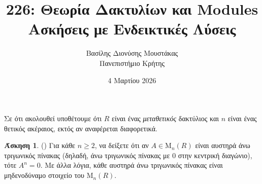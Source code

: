 \documentclass[12pt,a4paper,reqno]{amsart}
\title{226: Θεωρία Δακτυλίων και Modules \\ Ασκήσεις με Ενδεικτικές Λύσεις}
\author[Β.~Δ. Μουστακας]{Βασίλης Διονύσης Μουστάκας \\ Πανεπιστήμιο Κρήτης}
\date{4 Μαρτίου 2026}
\theoremstyle{definition}
\newtheorem{exercise}{Άσκηση}
\newcommand{\rmM}{\mathrm{M}}
\begin{document}
\begingroup
\def\uppercasenonmath#1{} %
\let\MakeUppercase\relax %
\maketitle
\endgroup

\setcounter{exercise}{4}
\setcounter{equation}{2}
\renewcommand{\thesubsection}{\thesection.\arabic{subsection}}

Σε ότι ακολουθεί υποθέτουμε ότι $R$ είναι ένας \emph{μεταθετικός} δακτύλιος και $n$ είναι ένας θετικός ακέραιος, εκτός αν αναφέρεται διαφορετικά.

\begin{exercise}{\rm(\cite[Άσκηση~7.2.8]{DF04})}
  \label{ex:DF_7.2.8}
  Για κάθε $n \ge 2$, να δείξετε ότι αν $A \in \rmM_n(R)$ είναι αυστηρά άνω τριγωνικός πίνακας (δηλαδή, άνω τριγωνικός πίνακας με $0$ στην κεντρική διαγώνιο), τότε $A^n=0$. Με άλλα λόγια, κάθε αυστηρά άνω τριγωνικός πίνακας είναι μηδενοδύναμο στοιχείο του $\rmM_n(R)$.
\end{exercise}
\end{document}
